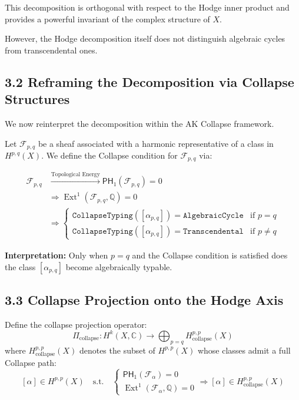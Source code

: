 \documentclass[11pt]{article}
\DeclareMathOperator{\Ext}{Ext}
\begin{document}
This decomposition is orthogonal with respect to the Hodge inner product and provides a powerful invariant of the complex structure of $X$.

However, the Hodge decomposition itself does not distinguish algebraic cycles from transcendental ones.

\subsection{3.2 Reframing the Decomposition via Collapse Structures}

We now reinterpret the decomposition within the AK Collapse framework.

Let $\mathcal{F}_{p,q}$ be a sheaf associated with a harmonic representative of a class in $H^{p,q}(X)$.  
We define the Collapse condition for $\mathcal{F}_{p,q}$ via:

\[
\begin{aligned}
\mathcal{F}_{p,q} &\xrightarrow{\text{Topological Energy}} \mathsf{PH}_1(\mathcal{F}_{p,q}) = 0 \\
&\Rightarrow \Ext^1(\mathcal{F}_{p,q}, \mathbb{Q}) = 0 \\
&\Rightarrow
\begin{cases}
\texttt{CollapseTyping}([\alpha_{p,q}]) = \texttt{AlgebraicCycle} & \text{if } p = q \\
\texttt{CollapseTyping}([\alpha_{p,q}]) = \texttt{Transcendental} & \text{if } p \ne q
\end{cases}
\end{aligned}
\]


\textbf{Interpretation:}  
Only when $p = q$ and the Collapse condition is satisfied does the class $[\alpha_{p,q}]$ become algebraically typable.

\subsection{3.3 Collapse Projection onto the Hodge Axis}

Define the collapse projection operator:
\[
\Pi_{\text{collapse}}: H^k(X, \mathbb{C}) \to \bigoplus_{p=q} H^{p,p}_{\text{collapse}}(X)
\]
where $H^{p,p}_{\text{collapse}}(X)$ denotes the subset of $H^{p,p}(X)$ whose classes admit a full Collapse path:
\[
[\alpha] \in H^{p,p}(X)
\quad \text{s.t.} \quad
\begin{cases}
\mathsf{PH}_1(\mathcal{F}_\alpha) = 0 \\
\Ext^1(\mathcal{F}_\alpha, \mathbb{Q}) = 0
\end{cases}
\Rightarrow
[\alpha] \in H^{p,p}_{\text{collapse}}(X)
\]
\end{document}
